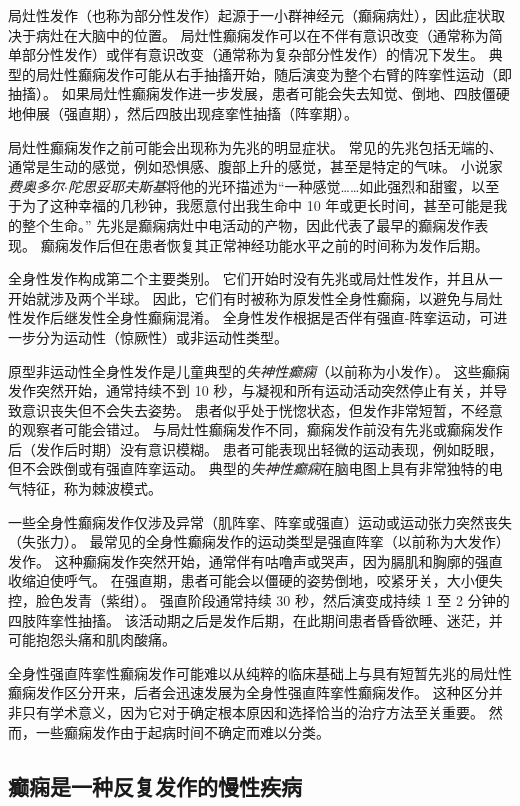 局灶性发作（也称为部分性发作）起源于一小群神经元（癫痫病灶），因此症状取决于病灶在大脑中的位置。
局灶性癫痫发作可以在不伴有意识改变（通常称为简单部分性发作）或伴有意识改变（通常称为复杂部分性发作）的情况下发生。
典型的局灶性癫痫发作可能从右手抽搐开始，随后演变为整个右臂的阵挛性运动（即抽搐）。
如果局灶性癫痫发作进一步发展，患者可能会失去知觉、倒地、四肢僵硬地伸展（强直期），然后四肢出现痉挛性抽搐（阵挛期）。


局灶性癫痫发作之前可能会出现称为先兆的明显症状。
常见的先兆包括无端的、通常是生动的感觉，例如恐惧感、腹部上升的感觉，甚至是特定的气味。
小说家\textit{费奥多尔$\cdot$陀思妥耶夫斯基}将他的光环描述为“一种感觉……如此强烈和甜蜜，以至于为了这种幸福的几秒钟，我愿意付出我生命中 10 年或更长时间，甚至可能是我的整个生命。” 
先兆是癫痫病灶中电活动的产物，因此代表了最早的癫痫发作表现。
癫痫发作后但在患者恢复其正常神经功能水平之前的时间称为发作后期。


全身性发作构成第二个主要类别。
它们开始时没有先兆或局灶性发作，并且从一开始就涉及两个半球。
因此，它们有时被称为原发性全身性癫痫，以避免与局灶性发作后继发性全身性癫痫混淆。
全身性发作根据是否伴有强直-阵挛运动，可进一步分为运动性（惊厥性）或非运动性类型。


原型非运动性全身性发作是儿童典型的\textit{失神性癫痫}（以前称为小发作）。
这些癫痫发作突然开始，通常持续不到 10 秒，与凝视和所有运动活动突然停止有关，并导致意识丧失但不会失去姿势。
患者似乎处于恍惚状态，但发作非常短暂，不经意的观察者可能会错过。
与局灶性癫痫发作不同，癫痫发作前没有先兆或癫痫发作后（发作后时期）没有意识模糊。
患者可能表现出轻微的运动表现，例如眨眼，但不会跌倒或有强直阵挛运动。
典型的\textit{失神性癫痫}在脑电图上具有非常独特的电气特征，称为棘波模式。


一些全身性癫痫发作仅涉及异常（肌阵挛、阵挛或强直）运动或运动张力突然丧失（失张力）。
最常见的全身性癫痫发作的运动类型是强直阵挛（以前称为大发作）发作。
这种癫痫发作突然开始，通常伴有咕噜声或哭声，因为膈肌和胸廓的强直收缩迫使呼气。
在强直期，患者可能会以僵硬的姿势倒地，咬紧牙关，大小便失控，脸色发青（紫绀）。
强直阶段通常持续 30 秒，然后演变成持续 1 至 2 分钟的四肢阵挛性抽搐。
该活动期之后是发作后期，在此期间患者昏昏欲睡、迷茫，并可能抱怨头痛和肌肉酸痛。


全身性强直阵挛性癫痫发作可能难以从纯粹的临床基础上与具有短暂先兆的局灶性癫痫发作区分开来，后者会迅速发展为全身性强直阵挛性癫痫发作。
这种区分并非只有学术意义，因为它对于确定根本原因和选择恰当的治疗方法至关重要。
然而，一些癫痫发作由于起病时间不确定而难以分类。



\subsection{癫痫是一种反复发作的慢性疾病}

